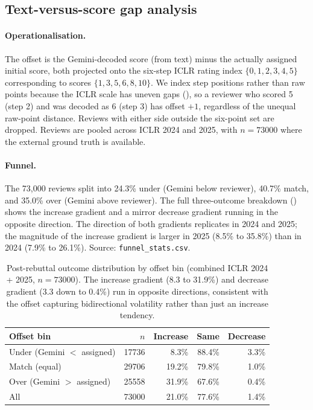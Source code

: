 \documentclass{article}
\newcommand{\code}[1]{\texttt{#1}}
\begin{document}
\subsection{Text-versus-score gap analysis}\label{app:text-score-gap}

\paragraph{Operationalisation.}
The offset is the Gemini-decoded score (from text) minus the actually assigned initial score, both projected onto the six-step ICLR rating index $\{0, 1, 2, 3, 4, 5\}$ corresponding to scores $\{1, 3, 5, 6, 8, 10\}$. We index step positions rather than raw points because the ICLR scale has uneven gaps (), so a reviewer who scored 5 (step 2) and was decoded as 6 (step 3) has offset $+1$, regardless of the unequal raw-point distance. Reviews with either side outside the six-point set are dropped. Reviews are pooled across ICLR 2024 and 2025, with $n = \num{73000}$ where the external ground truth is available.

\paragraph{Funnel.}
The 73,000 reviews split into 24.3\% under (Gemini below reviewer), 40.7\% match, and 35.0\% over (Gemini above reviewer). The full three-outcome breakdown () shows the increase gradient and a mirror decrease gradient running in the opposite direction. The direction of both gradients replicates in 2024 and 2025; the magnitude of the increase gradient is larger in 2025 (8.5\% to 35.8\%) than in 2024 (7.9\% to 26.1\%). Source: \code{funnel\_stats.csv}.

\begin{table}[htbp]
    \centering
    \caption{Post-rebuttal outcome distribution by offset bin (combined ICLR 2024 + 2025, $n = \num{73000}$). The increase gradient (8.3 to 31.9\%) and decrease gradient (3.3 down to 0.4\%) run in opposite directions, consistent with the offset capturing bidirectional volatility rather than just an increase tendency.}
    \label{tab:offset-funnel}
    \begin{tabular}{lrrrr}
    \toprule
    Offset bin & $n$ & Increase & Same & Decrease \\
    \midrule
    Under (Gemini $<$ assigned) & \num{17736} & 8.3\% & 88.4\% & 3.3\% \\
    Match (equal)               & \num{29706} & 19.2\% & 79.8\% & 1.0\% \\
    Over  (Gemini $>$ assigned) & \num{25558} & 31.9\% & 67.6\% & 0.4\% \\
    \midrule
    All                         & \num{73000} & 21.0\% & 77.6\% & 1.4\% \\
    \bottomrule
    \end{tabular}
\end{table}
\end{document}
